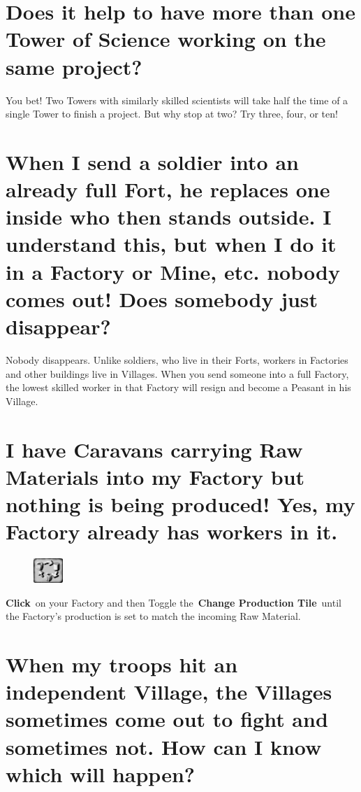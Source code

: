 \section{Does it help to have more than one Tower of Science working on the same project?}


You bet! Two Towers with similarly skilled scientists will take half the time of a single Tower to finish a project. But why stop at two? Try three, four, or ten!

\section{When I send a soldier into an already full Fort, he replaces one inside who then stands outside. I understand this, but when I do it in a Factory or Mine, etc. nobody comes out! Does somebody just disappear?}

Nobody disappears. Unlike soldiers, who live in their Forts, workers in Factories and other buildings live in Villages. When you send someone into a full Factory, the lowest skilled worker in that Factory will resign and become a Peasant in his Village.

\section{I have Caravans carrying Raw Materials into my Factory but nothing is being produced! Yes, my Factory already has workers in it.}

\begin{figure}
	\vspace{-20pt}
	\begin{center}
		\includegraphics[width=0.1\textwidth]{Tgoodcycling}
	\end{center}
	\vspace{-20pt}
\end{figure}

\textbf{Click} on your Factory and then Toggle the \textbf{Change Production Tile} until the Factory’s production is set to match the incoming Raw Material.

\section{When my troops hit an independent Village, the Villages sometimes come out to fight and sometimes not. How can I know which will happen?}

